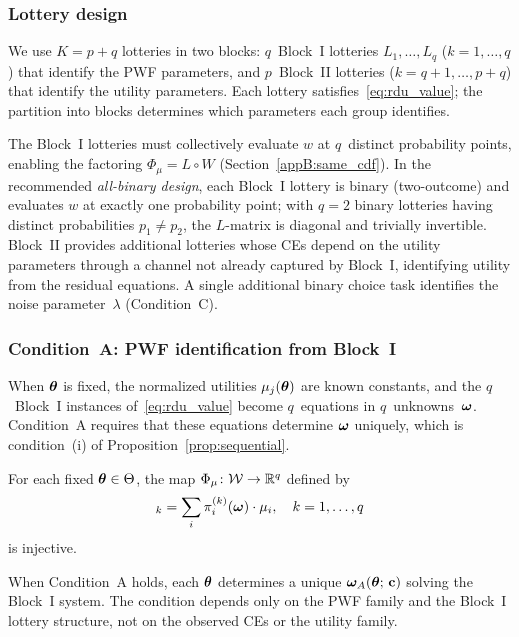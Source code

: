 \subsubsection{Lottery design}
\label{appB:design}

We use $K = p + q$ lotteries in two blocks:
$q$~Block~I lotteries $L_1, \ldots, L_q$ ($k = 1, \ldots, q$)
that identify the PWF parameters, and $p$~Block~II lotteries
($k = q{+}1, \ldots, p{+}q$) that identify the utility parameters.
Each lottery satisfies~\eqref{eq:rdu_value}; the partition into blocks
determines which parameters each group identifies.

The Block~I lotteries must collectively evaluate $w$ at $q$~distinct
probability points, enabling the factoring $\Phi_\mu = L \circ W$
(Section~\ref{appB:same_cdf}). In the recommended \emph{all-binary design},
each Block~I lottery is binary (two-outcome) and evaluates $w$ at
exactly one probability point; with $q = 2$ binary lotteries having
distinct probabilities $p_1 \neq p_2$, the $L$-matrix is
diagonal and trivially invertible. Block~II provides additional
lotteries whose CEs depend on the utility parameters through a
channel not already captured by Block~I, identifying utility from
the residual equations. A single additional binary choice task
identifies the noise parameter~$\lambda$ (Condition~C).

\subsubsection{Condition~A: PWF identification from Block~I}
\label{appB:condition_a}

When $\boldsymbol{\theta}$ is fixed, the normalized utilities
$\mu_j(\boldsymbol{\theta})$ are known constants, and the $q$~Block~I
instances of~\eqref{eq:rdu_value} become $q$~equations in
$q$~unknowns~$\boldsymbol{\omega}$. Condition~A requires that these
equations determine $\boldsymbol{\omega}$ uniquely, which is condition~(i) of
Proposition~\ref{prop:sequential}.

\begin{condition}[A]
\label{cond:A}
For each fixed $\boldsymbol{\theta} \in \Theta$, the map
$\Phi_\mu \colon \mathcal{W} \to \mathbb{R}^q$ defined by
\begin{equation}
    [\Phi_\mu(\bomega)]_k = \sum_i \pi_i^{(k)}(\bomega) \cdot \mu_i,
    \quad k = 1, \ldots, q
\end{equation}
is injective.
\end{condition}

When Condition~A holds, each $\boldsymbol{\theta}$ determines a unique
$\boldsymbol{\omega}_A(\boldsymbol{\theta};\, \mathbf{c})$ solving the Block~I system.
The condition depends only on the PWF family and the Block~I
lottery structure, not on the observed CEs or the utility family.

